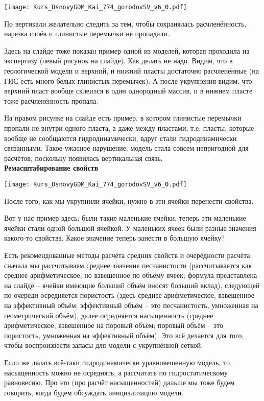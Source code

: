 \documentclass[main.tex]{subfiles}
\begin{document}
\texttt{[image: Kurs\_OsnovyGDM\_Kai\_774\_gorodovSV\_v6\_0.pdf]}

По вертикали желательно следить за тем, чтобы сохранялась расчленённость, нарезка слоёв и глинистые перемычки не пропадали.

Здесь на слайде тоже показан пример одной из моделей, которая проходила на экспертизу (левый рисунок на слайде).
Как делать не надо.
Видим, что в геологической модели и верхний, и нижний пласты достаточно расчленённые (на ГИС есть много белых глинистых перемычек).
А после укрупнения видим, что верхний пласт вообще склеился в один однородный массив, и в нижнем пласте тоже расчленённость пропала.

На правом рисунке на слайде есть пример, в котором глинистые перемычки пропали не внутри одного пласта, а даже между пластами, т.е. пласты, которые вообще не сообщаются гидродинамически, вдруг стали гидродинамически связанными.
Такое ужасное нарушение; модель стала совсем непригодной для расчётов, поскольку появилась вертикальная связь.
\\

\textbf{Ремасштабирование свойств}

\texttt{[image: Kurs\_OsnovyGDM\_Kai\_774\_gorodovSV\_v6\_0.pdf]}

После того, как мы укрупнили ячейки, нужно в эти ячейки перенести свойства.

Вот у нас пример здесь: были такие маленькие ячейки, теперь эти маленькие ячейки стали одной большой ячейкой. У маленьких ячеек были разные значения какого-то свойства. Какое значение теперь занести в большую ячейку?

Есть рекомендованные методы расчёта средних свойств и очерёдности расчёта: сначала мы рассчитываем среднее значение песчанистости (рассчитывается как среднее арифметическое, но взвешенное по объёму ячеек; формула представлена на слайде -- ячейки имеющие больший объём вносят больший вклад), следующей по очереди осредняется пористость (здесь среднее арифметическое, взвешенное на эффективный объём; эффективный объём -- это песчанистость, умноженная на геометрический объём), далее осредняется насыщенность (среднее арифметическое, взвешенное на поровый объём; поровый объём -- это пористость, умноженная на эффективный объём).
Это всё делается для того, чтобы воспроизвести запасы для модели с укрупнённой сеткой.

Если же делать всё-таки гидродинамически уравновешенную модель, то насыщенность можно не осреднять, а рассчитать по гидростатическому равновесию.
Про это (про расчёт насыщенностей) дальше мы тоже будем говорить, когда будем обсуждать инициализацию модели.
\\
\end{document}
